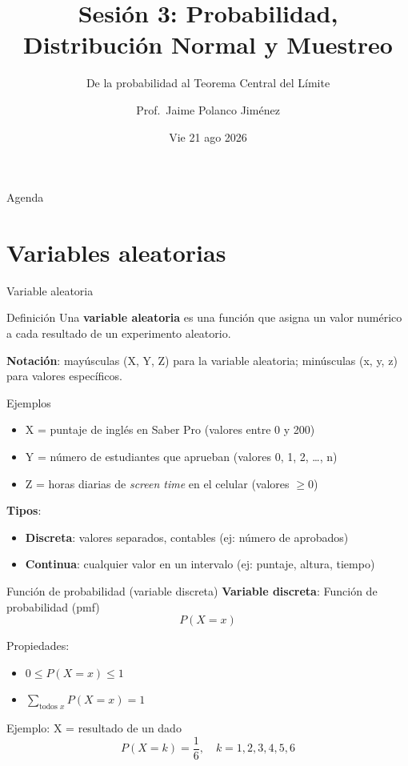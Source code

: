 \documentclass[aspectratio=169, 11pt]{beamer}
\title{Sesión 3: Probabilidad, Distribución Normal y Muestreo}
\subtitle{De la probabilidad al Teorema Central del Límite}
\author{Prof.\ Jaime Polanco Jim\'enez}
\date{Vie 21 ago 2026}
\begin{document}
\begin{frame}
\titlepage
\end{frame}

\begin{frame}{Agenda}
\tableofcontents
\end{frame}

\section{Variables aleatorias}

\begin{frame}{Variable aleatoria}
\begin{block}{Definición}
Una \textbf{variable aleatoria} es una función que asigna un valor numérico a cada resultado de un experimento aleatorio.
\end{block}

\textbf{Notación}: mayúsculas (X, Y, Z) para la variable aleatoria; minúsculas (x, y, z) para valores específicos.

\begin{exampleblock}{Ejemplos}
\begin{itemize}
\item X = puntaje de ingl\'es en Saber Pro (valores entre 0 y 200)
\item Y = n\'umero de estudiantes que aprueban (valores 0, 1, 2, \ldots, n)
\item Z = horas diarias de \emph{screen time} en el celular (valores $\geq 0$)
\end{itemize}
\end{exampleblock}

\textbf{Tipos}:
\begin{itemize}
\item \textbf{Discreta}: valores separados, contables (ej: número de aprobados)
\item \textbf{Continua}: cualquier valor en un intervalo (ej: puntaje, altura, tiempo)
\end{itemize}
\end{frame}

\begin{frame}{Función de probabilidad (variable discreta)}
\textbf{Variable discreta}: Función de probabilidad (pmf)
\[
P(X = x)
\]

Propiedades:
\begin{itemize}
\item $0 \leq P(X=x) \leq 1$
\item $\sum_{\text{todos } x} P(X=x) = 1$
\end{itemize}

\vspace{0.5em}
Ejemplo: X = resultado de un dado
\[
P(X=k) = \frac{1}{6}, \quad k=1,2,3,4,5,6
\]
\end{frame}
\end{document}
